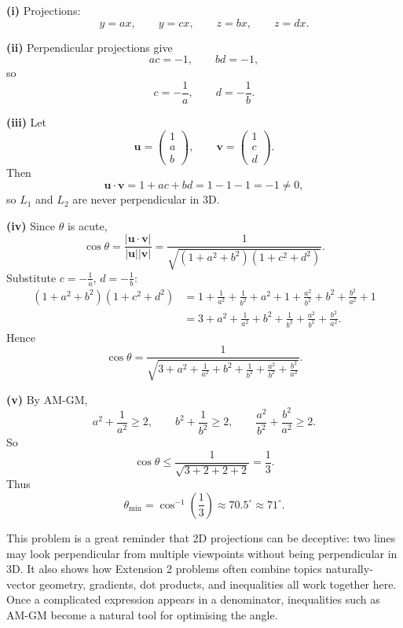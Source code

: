 \begin{solution}
\textbf{(i)} Projections:
\[
y=ax,\qquad y=cx,\qquad z=bx,\qquad z=dx.
\]

\textbf{(ii)} Perpendicular projections give
\[
ac=-1,\qquad bd=-1,
\]
so
\[
c=-\frac1a,\qquad d=-\frac1b.
\]

\textbf{(iii)} Let
\[
\mathbf{u}=\begin{pmatrix}1\\a\\b\end{pmatrix},\qquad
\mathbf{v}=\begin{pmatrix}1\\c\\d\end{pmatrix}.
\]
Then
\[
\mathbf{u}\cdot\mathbf{v}=1+ac+bd=1-1-1=-1\neq 0,
\]
so $L_1$ and $L_2$ are never perpendicular in 3D.

\textbf{(iv)} Since $\theta$ is acute,
\[
\cos\theta=\frac{|\mathbf{u}\cdot\mathbf{v}|}{|\mathbf{u}||\mathbf{v}|}
=\frac{1}{\sqrt{(1+a^2+b^2)(1+c^2+d^2)}}.
\]
Substitute $c=-\frac1a$, $d=-\frac1b$:
\begin{align*}
(1+a^2+b^2)(1+c^2+d^2)
&=1+\frac1{a^2}+\frac1{b^2}+a^2+1+\frac{a^2}{b^2}+b^2+\frac{b^2}{a^2}+1 \\
&=3+a^2+\frac1{a^2}+b^2+\frac1{b^2}+\frac{a^2}{b^2}+\frac{b^2}{a^2}.
\end{align*}
Hence
\[
\cos \theta = \frac{1}{\sqrt{3 + a^2 + \frac{1}{a^2} + b^2 + \frac{1}{b^2} + \frac{a^2}{b^2} + \frac{b^2}{a^2}}}.
\]

\textbf{(v)} By AM-GM,
\[
a^2+\frac1{a^2}\ge 2,\qquad b^2+\frac1{b^2}\ge 2,\qquad \frac{a^2}{b^2}+\frac{b^2}{a^2}\ge 2.
\]
So
\[
\cos\theta\le \frac{1}{\sqrt{3+2+2+2}}=\frac13.
\]
Thus
\[
\theta_{\min}=\cos^{-1}\left(\frac13\right)\approx 70.5^\circ \approx \boxed{71^\circ}.
\]
\end{solution}

\begin{takeaways}
This problem is a great reminder that 2D projections can be deceptive: two lines may look perpendicular from multiple viewpoints without being perpendicular in 3D. It also shows how Extension 2 problems often combine topics naturally-vector geometry, gradients, dot products, and inequalities all work together here. Once a complicated expression appears in a denominator, inequalities such as AM-GM become a natural tool for optimising the angle.
\end{takeaways}

\vspace{1em}

